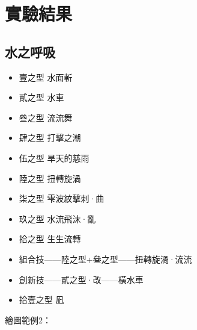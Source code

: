 \chapter{實驗結果}\label{result}

\section{水之呼吸}
\begin{itemize}
\item 壹之型 水面斬
\item 貳之型 水車
\item 叄之型 流流舞
\item 肆之型 打擊之潮
\item 伍之型 旱天的慈雨
\item 陸之型 扭轉旋渦
\item 柒之型 雫波紋擊刺·曲
\item 玖之型 水流飛沫·亂
\item 拾之型 生生流轉
\item 組合技——陸之型+叄之型——扭轉旋渦·流流
\item 創新技——貳之型·改——橫水車
\item 拾壹之型 凪
\end{itemize}

繪圖範例2：
\begin{center}
\end{center}
